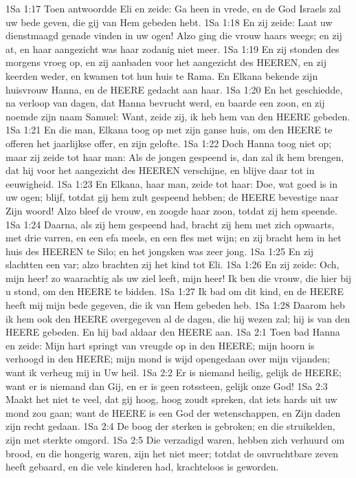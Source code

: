 1Sa 1:17  Toen antwoordde Eli en zeide: Ga heen in vrede, en de God Israels zal uw bede geven, die gij van Hem gebeden hebt.
1Sa 1:18  En zij zeide: Laat uw dienstmaagd genade vinden in uw ogen! Alzo ging die vrouw haars weegs; en zij at, en haar aangezicht was haar zodanig niet meer.
1Sa 1:19  En zij stonden des morgens vroeg op, en zij aanbaden voor het aangezicht des HEEREN, en zij keerden weder, en kwamen tot hun huis te Rama. En Elkana bekende zijn huisvrouw Hanna, en de HEERE gedacht aan haar.
1Sa 1:20  En het geschiedde, na verloop van dagen, dat Hanna bevrucht werd, en baarde een zoon, en zij noemde zijn naam Samuel: Want, zeide zij, ik heb hem van den HEERE gebeden.
1Sa 1:21  En die man, Elkana toog op met zijn ganse huis, om den HEERE te offeren het jaarlijkse offer, en zijn gelofte.
1Sa 1:22  Doch Hanna toog niet op; maar zij zeide tot haar man: Als de jongen gespeend is, dan zal ik hem brengen, dat hij voor het aangezicht des HEEREN verschijne, en blijve daar tot in eeuwigheid.
1Sa 1:23  En Elkana, haar man, zeide tot haar: Doe, wat goed is in uw ogen; blijf, totdat gij hem zult gespeend hebben; de HEERE bevestige naar Zijn woord! Alzo bleef de vrouw, en zoogde haar zoon, totdat zij hem speende.
1Sa 1:24  Daarna, als zij hem gespeend had, bracht zij hem met zich opwaarts, met drie varren, en een efa meels, en een fles met wijn; en zij bracht hem in het huis des HEEREN te Silo; en het jongsken was zeer jong.
1Sa 1:25  En zij slachtten een var; alzo brachten zij het kind tot Eli.
1Sa 1:26  En zij zeide: Och, mijn heer! zo waarachtig als uw ziel leeft, mijn heer! Ik ben die vrouw, die hier bij u stond, om den HEERE te bidden.
1Sa 1:27  Ik bad om dit kind, en de HEERE heeft mij mijn bede gegeven, die ik van Hem gebeden heb.
1Sa 1:28  Daarom heb ik hem ook den HEERE overgegeven al de dagen, die hij wezen zal; hij is van den HEERE gebeden. En hij bad aldaar den HEERE aan.
1Sa 2:1  Toen bad Hanna en zeide: Mijn hart springt van vreugde op in den HEERE; mijn hoorn is verhoogd in den HEERE; mijn mond is wijd opengedaan over mijn vijanden; want ik verheug mij in Uw heil.
1Sa 2:2  Er is niemand heilig, gelijk de HEERE; want er is niemand dan Gij, en er is geen rotssteen, gelijk onze God!
1Sa 2:3  Maakt het niet te veel, dat gij hoog, hoog zoudt spreken, dat iets hards uit uw mond zou gaan; want de HEERE is een God der wetenschappen, en Zijn daden zijn recht gedaan.
1Sa 2:4  De boog der sterken is gebroken; en die struikelden, zijn met sterkte omgord.
1Sa 2:5  Die verzadigd waren, hebben zich verhuurd om brood, en die hongerig waren, zijn het niet meer; totdat de onvruchtbare zeven heeft gebaard, en die vele kinderen had, krachteloos is geworden.
